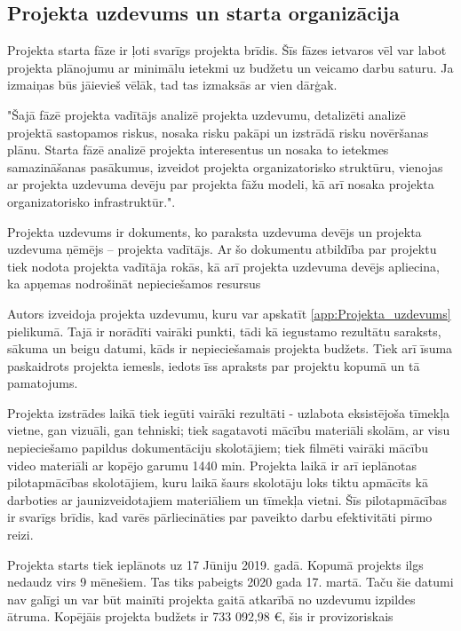 \subsection{Projekta uzdevums un starta organizācija}
Projekta starta fāze ir ļoti svarīgs projekta brīdis. Šīs fāzes ietvaros vēl var labot 
projekta plānojumu ar minimālu ietekmi uz budžetu un veicamo darbu saturu. Ja izmaiņas būs
jāievieš vēlāk, tad tas izmaksās ar vien dārģak.
\par
"Šajā fāzē projekta vadītājs analizē projekta uzdevumu, detalizēti analizē projektā
sastopamos riskus, nosaka risku pakāpi un izstrādā risku novēršanas plānu. Starta fāzē analizē
projekta interesentus un nosaka to ietekmes samazināšanas pasākumus, izveidot projekta
organizatorisko struktūru, vienojas ar projekta uzdevuma devēju par projekta fāžu modeli, kā arī
nosaka projekta organizatorisko infrastruktūr."\cite{zane_12}.
\par
Projekta uzdevums ir dokuments, ko paraksta uzdevuma devējs un projekta uzdevuma
ņēmējs – projekta vadītājs. Ar šo dokumentu atbildība par projektu tiek nodota projekta vadītāja
rokās, kā arī projekta uzdevuma devējs apliecina, ka apņemas nodrošināt nepieciešamos resursus %
\par
Autors izveidoja projekta uzdevumu, kuru var apskatīt \ref{app:Projekta_uzdevums} pielikumā. Tajā ir
norādīti vairāki punkti, tādi kā iegustamo rezultātu saraksts, sākuma un beigu datumi, kāds ir nepieciešamais 
projekta budžets. Tiek arī īsuma paskaidrots projekta iemesls, iedots īss apraksts par projektu kopumā un tā
pamatojums. 
\par
Projekta izstrādes laikā tiek iegūti vairāki rezultāti - uzlabota eksistējoša tīmekļa vietne, gan vizuāli,
gan tehniski; tiek sagatavoti mācību materiāli skolām, ar visu nepieciešamo papildus dokumentāciju 
skolotājiem; tiek filmēti vairāki mācību video materiāli ar kopējo garumu 1440 min. Projekta laikā ir arī
ieplānotas pilotapmācības skolotājiem, kuru laikā šaurs skolotāju loks tiktu apmācīts kā darboties ar
jaunizveidotajiem materiāliem un tīmekļa vietni. Šīs pilotapmācības ir svarīgs brīdis, kad varēs pārliecināties
par paveikto darbu efektivitāti pirmo reizi.
\par
Projekta starts tiek ieplānots uz 17 Jūniju 2019. gadā. Kopumā projekts ilgs nedaudz virs 9 mēnešiem.
Tas tiks pabeigts 2020 gada 17. martā. Taču šie datumi nav galīgi un var būt mainīti projekta gaitā
atkarībā no uzdevumu izpildes ātruma. Kopējāis projekta budžets ir 733 092,98 €, šis ir provizoriskais 
